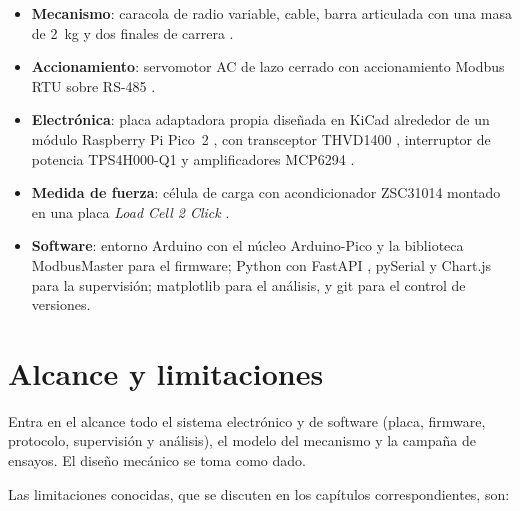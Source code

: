 \begin{itemize}
  \item \textbf{Mecanismo}: caracola de radio variable, cable, barra articulada con una masa de
        \SI{2}{\kilo\gram} y dos finales de carrera
        .
  \item \textbf{Accionamiento}: servomotor AC de lazo cerrado con accionamiento Modbus RTU
        sobre RS-485 .
  \item \textbf{Electrónica}: placa adaptadora propia diseñada en KiCad \cite{kicad} alrededor de un
        módulo Raspberry Pi Pico~2 \cite{rp2350}, con transceptor THVD1400 \cite{thvd1400},
        interruptor de potencia TPS4H000-Q1 \cite{tps4h000} y amplificadores MCP6294
        \cite{mcp629x}.
  \item \textbf{Medida de fuerza}: célula de carga con acondicionador ZSC31014 \cite{zsc31014}
        montado en una placa \emph{Load Cell 2 Click} \cite{mikroelc2}.
  \item \textbf{Software}: entorno Arduino con el núcleo Arduino-Pico \cite{arduinopico} y la
        biblioteca ModbusMaster \cite{modbusmaster} para el firmware; Python con FastAPI
        \cite{fastapi}, pySerial \cite{pyserial} y Chart.js \cite{chartjs} para la supervisión;
        matplotlib \cite{matplotlib} para el análisis, y git para el control de versiones.
\end{itemize}

\section{Alcance y limitaciones}

Entra en el alcance todo el sistema electrónico y de software (placa, firmware, protocolo,
supervisión y análisis), el modelo del mecanismo y la campaña de ensayos. El diseño mecánico se
toma como dado.

Las limitaciones conocidas, que se discuten en los capítulos correspondientes, son:

